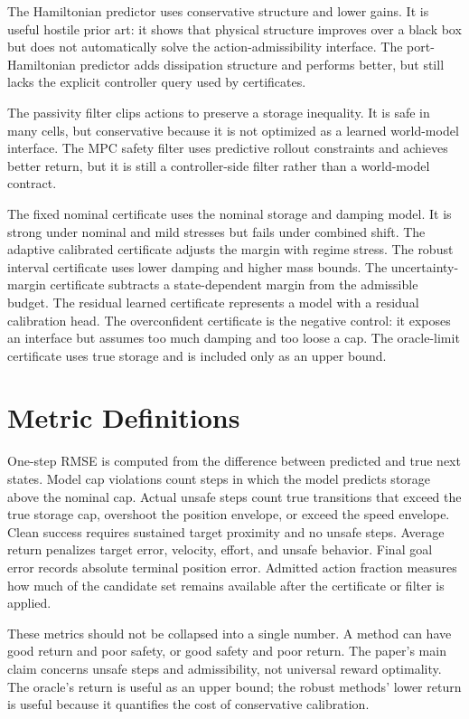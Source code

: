 \documentclass{article}
\begin{document}
The Hamiltonian predictor uses conservative structure and lower gains. It is useful hostile prior art: it shows that physical structure improves over a black box but does not automatically solve the action-admissibility interface. The port-Hamiltonian predictor adds dissipation structure and performs better, but still lacks the explicit controller query used by certificates.

The passivity filter clips actions to preserve a storage inequality. It is safe in many cells, but conservative because it is not optimized as a learned world-model interface. The MPC safety filter uses predictive rollout constraints and achieves better return, but it is still a controller-side filter rather than a world-model contract.

The fixed nominal certificate uses the nominal storage and damping model. It is strong under nominal and mild stresses but fails under combined shift. The adaptive calibrated certificate adjusts the margin with regime stress. The robust interval certificate uses lower damping and higher mass bounds. The uncertainty-margin certificate subtracts a state-dependent margin from the admissible budget. The residual learned certificate represents a model with a residual calibration head. The overconfident certificate is the negative control: it exposes an interface but assumes too much damping and too loose a cap. The oracle-limit certificate uses true storage and is included only as an upper bound.

\section{Metric Definitions}

One-step RMSE is computed from the difference between predicted and true next states. Model cap violations count steps in which the model predicts storage above the nominal cap. Actual unsafe steps count true transitions that exceed the true storage cap, overshoot the position envelope, or exceed the speed envelope. Clean success requires sustained target proximity and no unsafe steps. Average return penalizes target error, velocity, effort, and unsafe behavior. Final goal error records absolute terminal position error. Admitted action fraction measures how much of the candidate set remains available after the certificate or filter is applied.

These metrics should not be collapsed into a single number. A method can have good return and poor safety, or good safety and poor return. The paper's main claim concerns unsafe steps and admissibility, not universal reward optimality. The oracle's return is useful as an upper bound; the robust methods' lower return is useful because it quantifies the cost of conservative calibration.
\end{document}
